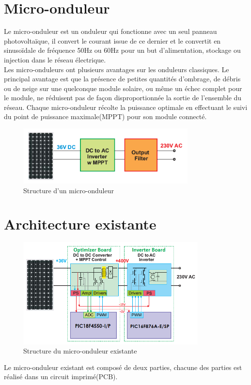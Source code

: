 \documentclass[11pt, a4paper, twoside]{book}
\begin{document}
{\section{Micro-onduleur}
Le micro-onduleur est un onduleur qui fonctionne avec un seul panneau photovoltaïque, il convert le courant issue de ce dernier et le convertit en sinusoïdale de fréquence 50Hz ou 60Hz pour un but d'alimentation, stockage ou injection dans le réseau électrique.\\

Les micro-onduleurs ont plusieurs avantages sur les onduleurs classiques. Le principal avantage est que la présence de petites quantités d'ombrage, de débris ou de neige sur une quelconque module solaire, ou même un échec complet pour le module, ne réduisent pas de façon disproportionnée la sortie de l'ensemble du réseau. Chaque micro-onduleur récolte la puissance optimale en effectuant le suivi du point de puissance maximale(MPPT) pour son module connecté.
\begin{figure}[H]
\centering
\includegraphics[width=0.8\textwidth]{microinverter}
\caption{Structure d'un micro-onduleur}
\end{figure}

\section{Architecture existante}
\begin{figure}[h]
\centering
\includegraphics[width=0.85\textwidth]{existingMicroinverter}
\caption{Structure du micro-onduleur existante}
\end{figure}
Le micro-onduleur existant est composé de deux parties, chacune des parties est réalisé dans un circuit imprimé(PCB).\\

}
\end{document}
